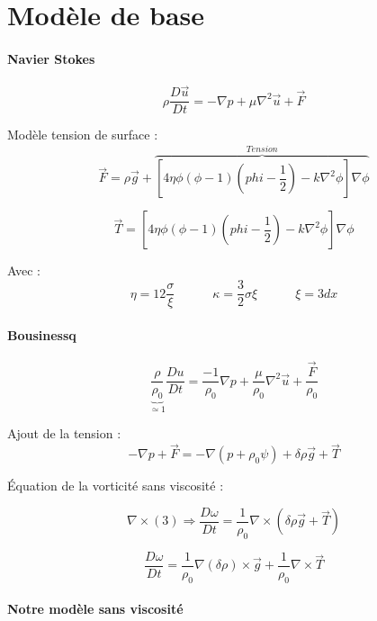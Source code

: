 \documentclass[10pt,a4paper]{article}
\author{Malo Kerebel}
\begin{document}
\section{Modèle de base}


\paragraph{Navier Stokes }

\begin{equation}
	\rho \dfrac{D \vec{u}}{D t} = - \nabla p + \mu \nabla^2 \vec{u} + \vec{F}
\end{equation}

Modèle tension de surface :
\begin{equation}
	\vec{F} = \rho \vec{g} + \overbrace{\left[ 4 \eta \phi (\phi - 1) \left(phi - \dfrac{1}{2} \right) - k\nabla^2 \phi \right] \nabla \phi}^{Tension}
\end{equation}

\[ \vec{T} = \left[ 4 \eta \phi (\phi - 1) \left(phi - \dfrac{1}{2} \right) - k\nabla^2 \phi \right] \nabla \phi\]

Avec :
\[
	\eta = 12 \dfrac{\sigma}{\xi} \quad \quad \quad \kappa = \dfrac{3}{2} \sigma \xi \quad \quad \quad \xi = 3 dx
\]

\paragraph{Bousinessq}

\begin{equation}
	\underbrace{\dfrac{\rho}{\rho_0}}_{\simeq 1} \dfrac{D u}{D t} = \dfrac{-1}{\rho_0} \nabla p + \dfrac{\mu }{\rho_0} \nabla^2 \vec{u} + \dfrac{\vec{F}}{\rho_0}
\end{equation}

Ajout de la tension :
\[
	-\nabla p + \vec{F} = - \nabla (p + \rho_0 \psi) + \delta \rho \vec{g} + \vec{T}
\]

Équation de la vorticité sans viscosité :

\[
	\nabla \times (3) \Rightarrow \dfrac{D\omega}{D t} =  \dfrac{1}{\rho_0} \nabla \times \left( \delta \rho \vec{g} + \vec{T} \right)
\]

\[
	\dfrac{D\omega}{D t} = \dfrac{1}{\rho_0} \nabla (\delta \rho) \times \vec{g} + \dfrac{1}{\rho_0} \nabla \times \vec{T}
\]

\paragraph{Notre modèle sans viscosité }
\end{document}
